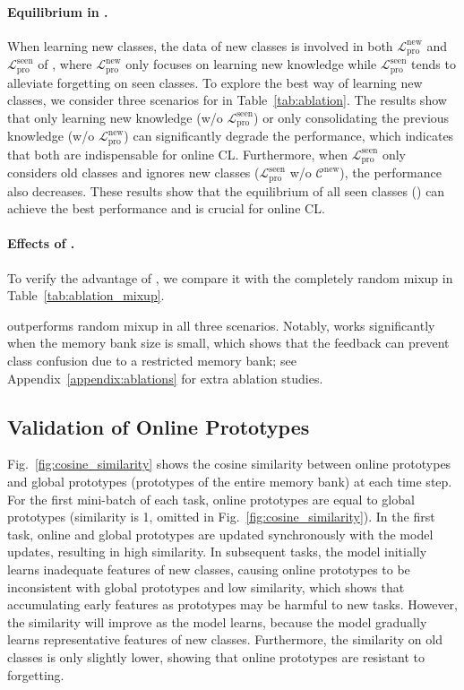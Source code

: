 \paragraph{Equilibrium in \methodname.}
When learning new classes, the data of new classes is involved in both $\mathcal{L}^{\mathrm{new}}_{\mathrm{pro}}$ and $\mathcal{L}^{\mathrm{seen}}_{\mathrm{pro}}$ of \methodname, where $\mathcal{L}^{\mathrm{new}}_{\mathrm{pro}}$ only focuses on learning new knowledge while $\mathcal{L}^{\mathrm{seen}}_{\mathrm{pro}}$ tends to alleviate forgetting on seen classes.
To explore the best way of learning new classes, we consider three scenarios for \methodname in Table~\ref{tab:ablation}.
The results show that only learning new knowledge (w/o $\mathcal{L}^{\mathrm{seen}}_{\mathrm{pro}}$) or only consolidating the previous knowledge (w/o $\mathcal{L}^{\mathrm{new}}_{\mathrm{pro}}$) can significantly degrade the performance, which indicates that both are indispensable for online CL.
Furthermore, when $\mathcal{L}^{\mathrm{seen}}_{\mathrm{pro}}$ only considers old classes and ignores new classes ($\mathcal{L}^{\mathrm{seen}}_{\mathrm{pro}}$ w/o $\mathcal{C}^\mathrm{new}$), the performance also decreases. These results show that the equilibrium of all seen classes (\methodname) can achieve the best performance and is crucial for online CL.


\paragraph{Effects of \dataaugname.} 
To verify the advantage of \dataaugname, we compare it with the completely random mixup
in Table~\ref{tab:ablation_mixup}.

\dataaugname outperforms random mixup in all three scenarios. Notably, \dataaugname works significantly when the memory bank size is small, which shows that the feedback can prevent class confusion due to a restricted memory bank; see Appendix~\ref{appendix:ablations} for extra ablation studies.



\subsection{Validation of Online Prototypes}
\label{prove_onlinePrototypes}

Fig.~\ref{fig:cosine_similarity} shows the cosine similarity between online prototypes and global prototypes (prototypes of the entire memory bank) at each time step.
For the first mini-batch of each task, online prototypes are equal to global prototypes (similarity is 1, omitted in Fig.~\ref{fig:cosine_similarity}).
In the first task, online and global prototypes are updated synchronously with the model updates, resulting in high similarity. 
In subsequent tasks, the model initially learns inadequate features of new classes, causing online prototypes to be inconsistent with global prototypes and low similarity, which shows that accumulating early features as prototypes may be harmful to new tasks. However, the similarity will improve as the model learns, because the model gradually learns representative features of new classes.
Furthermore, the similarity on old classes is only slightly lower, showing that online prototypes are resistant to forgetting. 
